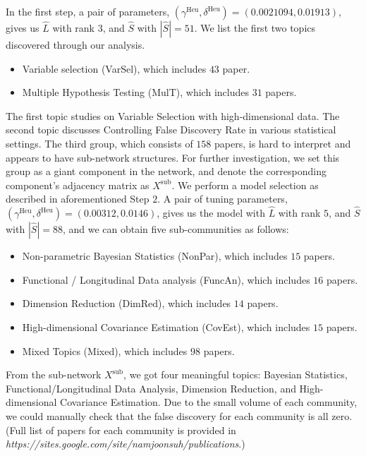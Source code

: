 \documentclass[AMS,STIX1COL]{WileyNJD-v2}
\begin{document}
{In the first step, a pair of parameters, $(\gamma^{\text{Heu}},\delta^{\text{Heu}}) = (0.0021094, 0.01913)$, gives us $\widehat{L}$ with rank $3$, and $\widehat{S}$ with $|\widehat{S}|=51$.
We list the first two topics discovered through our analysis.
\begin{itemize}
    \item Variable selection (VarSel), which includes $43$ paper.
    \item Multiple Hypothesis Testing (MulT), which includes $31$ papers.
\end{itemize}
The first topic studies on Variable Selection with high-dimensional data.
The second topic discusses Controlling False Discovery Rate in various statistical settings.
The third group, which consists of $158$ papers, is hard to interpret and appears to have sub-network structures.
For further investigation, we set this group as a giant component in the network, and denote the corresponding component's adjacency matrix as $X^{\mbox{sub}}$.
We perform a model selection as described in aforementioned Step $2$.
A pair of tuning parameters, $(\gamma^{\text{Heu}},\delta^{\text{Heu}}) = (0.00312, 0.0146)$, gives us the model with $\widehat{L}$ with rank $5$, and $\widehat{S}$ with $|\widehat{S}|=88$,
and we can obtain five sub-communities as follows:
\begin{itemize}
    \item Non-parametric Bayesian Statistics (NonPar), which includes $15$ papers.
    \item Functional / Longitudinal Data analysis (FuncAn), which includes $16$ papers.
    \item Dimension Reduction (DimRed), which includes $14$ papers.
    \item High-dimensional Covariance Estimation (CovEst), which includes $15$ papers.
    \item Mixed Topics (Mixed), which includes $98$ papers.
\end{itemize}
From the sub-network $X^{\mbox{sub}}$, we got four meaningful topics: Bayesian Statistics, Functional/Longitudinal Data Analysis, Dimension Reduction, and High-dimensional Covariance Estimation.
Due to the small volume of each community, we could manually check that the false discovery for each community is all zero.
(Full list of papers for each community is provided in {\em https://sites.google.com/site/namjoonsuh/publications}.)

}
\end{document}
